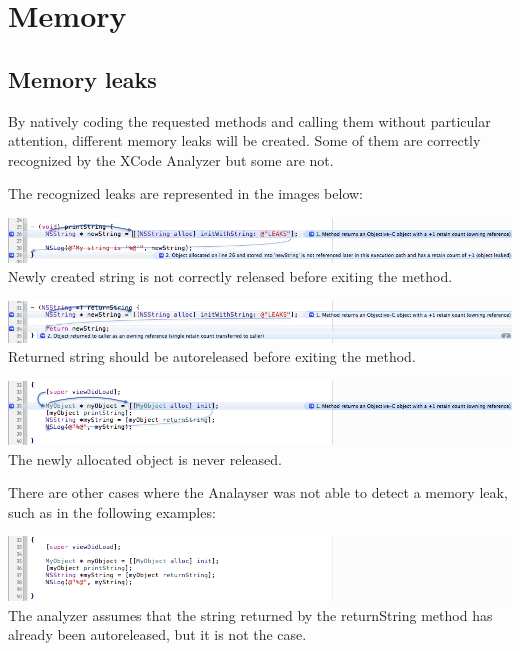 \documentclass[a4paper,10pt]{article}
\begin{document}
	
	
	
	
	\section{Memory}
		\subsection{Memory leaks}

		By natively coding the requested methods and calling them without particular attention, different memory leaks will be created. Some of them are correctly recognized by the XCode Analyzer but some are not.
		
		The recognized leaks are represented in the images below:		
		
		\begin{center}
			\includegraphics[width=1\textwidth]{./images/printresult_leak.png}
			Newly created string is not correctly released before exiting the method.
		\end{center}		
		
		\begin{center}
			\includegraphics[width=1\textwidth]{./images/returnresult_leak.png}
			Returned string should be autoreleased before exiting the method.
		\end{center}
		
		\begin{center}
			\includegraphics[width=1\textwidth]{./images/object_leak.png}
			The newly allocated object is never released.
		\end{center}
		
		There are other cases where the Analayser was not able to detect a memory leak, such as in the following examples:
		
		\begin{center}
			\includegraphics[width=1\textwidth]{./images/string_noleak.png}
			The analyzer assumes that the string returned by the returnString method has already been autoreleased, but it is not the case. 
		\end{center}
		
\end{document}
